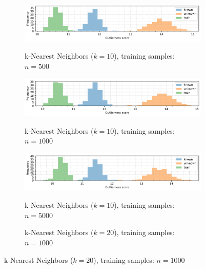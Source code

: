\begin{figure}[t]
    \centering
    \begin{subfigure}[b]{\textwidth}
        \centering
        \caption{\small k-Nearest Neighbors ($k=10$), training samples: $n = 500$}
        \includegraphics[width=\textwidth]{images/distributions/hists-knn-samples/hist-distributions-dimension_250-samples_500-distance_8-distribution_uniform-model_kNN-10-seed_0.pdf}
        \label{fig:hists-knn-500}
    \end{subfigure}
    \begin{subfigure}[b]{\textwidth}
        \centering
        \caption{\small k-Nearest Neighbors ($k=10$), training samples: $n = 1000$}
        \includegraphics[width=\textwidth]{images/distributions/hists-knn-samples/hist-distributions-dimension_250-samples_1000-distance_8-distribution_uniform-model_kNN-10-seed_0.pdf}
        \label{fig:hists-knn-1000}
    \end{subfigure}
    \begin{subfigure}[b]{\textwidth}
        \centering
        \caption{\small k-Nearest Neighbors ($k=10$), training samples: $n = 5000$}
        \includegraphics[width=\textwidth]{images/distributions/hists-knn-samples/hist-distributions-dimension_250-samples_5000-distance_8-distribution_uniform-model_kNN-10-seed_0.pdf}
        \label{fig:hists-knn-5000}
    \end{subfigure}
    \begin{subfigure}[b]{\textwidth}
        \centering
        \caption{\small k-Nearest Neighbors ($k=20$), training samples: $n = 1000$}

\end{subfigure}
\end{figure}
